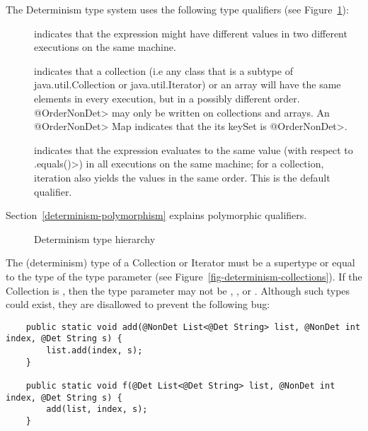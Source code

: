 
The Determinism type system uses the following type qualifiers (see Figure~\ref{fig-determinism-hierarchy}):
\begin{description}
\item[] indicates
  that the expression might have different values in two different executions on the same machine.
\item[] indicates that
  a collection (i.e any class that is a subtype of java.util.Collection or java.util.Iterator) or an array will have the same elements in every execution, but in a
  possibly different order.  \<@OrderNonDet> may only be written on
  collections and arrays. An \<@OrderNonDet> Map indicates that the its keySet is \<@OrderNonDet>.
\item[] indicates that
  the expression evaluates to the same value (with respect to \<.equals()>) in all
  executions on the same machine; for a collection, iteration also yields the values in the same
  order.
  This is the default qualifier.
\end{description}

Section~\ref{determinism-polymorphism} explains polymorphic qualifiers.

\begin{figure}
  \begin{center}
  \end{center}
\caption{Determinism type hierarchy}
\label{fig-determinism-hierarchy}
\end{figure}



The (determinism) type of a Collection or Iterator must be a supertype or equal to
the type of the type parameter (see Figure~\ref{fig-determinism-collections}).
If the Collection is , then the type parameter may not be
, , or . Although such types could exist, they are
disallowed to prevent the following bug:

\begin{Verbatim}
    public static void add(@NonDet List<@Det String> list, @NonDet int index, @Det String s) {
        list.add(index, s);
    }

    public static void f(@Det List<@Det String> list, @NonDet int index, @Det String s) {
        add(list, index, s);
    }
\end{Verbatim}

